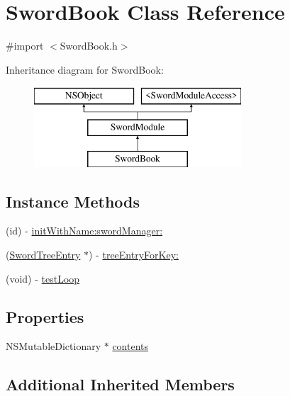 \hypertarget{interface_sword_book}{\section{Sword\-Book Class Reference}
\label{interface_sword_book}
}


{\ttfamily \#import $<$Sword\-Book.\-h$>$}

Inheritance diagram for Sword\-Book\-:\begin{figure}[H]
\begin{center}
\leavevmode
\includegraphics[height=3.000000cm]{interface_sword_book}
\end{center}
\end{figure}
\subsection*{Instance Methods}
\begin{DoxyCompactItemize}
\item 
(id) -\/ \hyperlink{interface_sword_book_a59d9654a2481d74c2f4d08c15a4910ce}{init\-With\-Name\-:sword\-Manager\-:}
\item 
(\hyperlink{interface_sword_tree_entry}{Sword\-Tree\-Entry} $\ast$) -\/ \hyperlink{interface_sword_book_a0f99bbbf89bd08d2956e3153ead8a2e3}{tree\-Entry\-For\-Key\-:}
\item 
(void) -\/ \hyperlink{interface_sword_book_a29f0145032190c9b34677dca673b8216}{test\-Loop}
\end{DoxyCompactItemize}
\subsection*{Properties}
\begin{DoxyCompactItemize}
\item 
N\-S\-Mutable\-Dictionary $\ast$ \hyperlink{interface_sword_book_a9cefdcab320999fc518fbccc3fd0fcdd}{contents}
\end{DoxyCompactItemize}
\subsection*{Additional Inherited Members}


